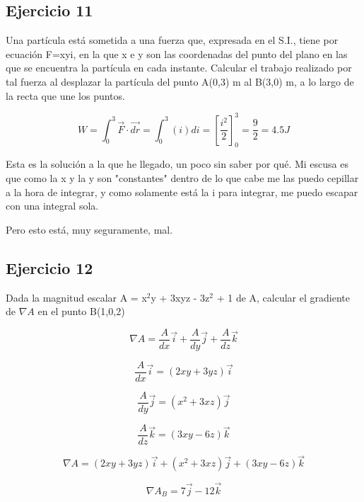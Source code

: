 \subsection{Ejercicio 11}
Una partícula está sometida a una fuerza que,
expresada en el S.I., tiene por ecuación F=xyi,
en la que x e y son las coordenadas del punto
del plano en las que se encuentra la partícula en
cada instante. Calcular el trabajo realizado por
tal fuerza al desplazar la partícula del punto
A(0,3) m al B(3,0) m, a lo largo de la recta
que une los puntos.

$$
W = \int_{0}^{3}\overrightarrow{F}
\cdot \overrightarrow{dr} 
= \int_{0}^{3}(i)di
= \left[\frac{i^2}{2}\right]_{0}^{3} = \frac{9}{2} = 4.5 J
$$

Esta es la solución a la que he llegado, un poco
sin saber por qué. Mi escusa es que como la x y la y son
"constantes" dentro de lo que cabe me las puedo cepillar
a la hora de integrar, y como solamente está la i
para integrar, me puedo escapar con una integral sola.

Pero esto está, muy seguramente, mal.

\subsection{Ejercicio 12}
Dada la magnitud escalar A = x$^2$y + 3xyz - 3z$^2$ + 1
de A, calcular el gradiente de $\nabla A$ en el
punto B(1,0,2)

$$
\nabla A = \frac{A}{dx}\overrightarrow{i}
+ \frac{A}{dy}\overrightarrow{j}
+ \frac{A}{dz}\overrightarrow{k}
$$

$$
\frac{A}{dx}\overrightarrow{i}
= (2xy+3yz)\overrightarrow{i}
$$

$$
\frac{A}{dy}\overrightarrow{j}
= (x^2+3xz)\overrightarrow{j}
$$

$$
\frac{A}{dz}\overrightarrow{k}
= (3xy - 6z)\overrightarrow{k}
$$

$$
\nabla A = (2xy+3yz)\overrightarrow{i}
+ (x^2+3xz)\overrightarrow{j}
+ (3xy-6z)\overrightarrow{k}
$$

$$
\nabla A_B = 7\overrightarrow{j} -12\overrightarrow{k}
$$